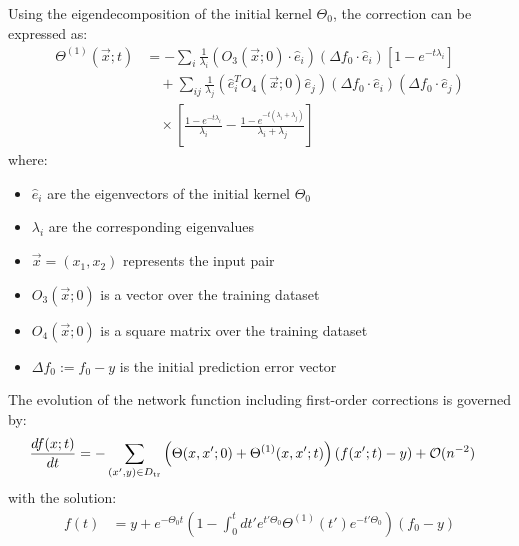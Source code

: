 \documentclass[a4paper]{article}
\begin{document}
\begin{theorem}\label{thm:eigen_corrections}
Using the eigendecomposition of the initial kernel $\Theta_0$, the correction can be expressed as:
\begin{align}
\Theta^{(1)}(\vec{x};t) &= -\sum_{i}\frac{1}{\lambda_{i}}(O_{3}(\vec{x};0)\cdot\hat{e}_{i})(\Delta f_{0}\cdot\hat{e}_{i})\left[1-e^{-t\lambda_{i}}\right] \nonumber\\
&\quad +\sum_{ij}\frac{1}{\lambda_{j}}(\hat{e}_{i}^{T}O_{4}(\vec{x};0)\hat{e}_{j})(\Delta f_{0}\cdot \hat{e}_{i})(\Delta f_{0}\cdot \hat{e}_{j}) \nonumber\\
&\quad \times \left[\frac{1-e^{-t\lambda_{i}}}{\lambda_{i}}-\frac{1-e^{-t(\lambda_{i}+\lambda_{j})}}{\lambda_{i}+\lambda_{j}}\right] \label{eq:eigen_expansion}
\end{align}
where:
\begin{itemize}
\item $\hat{e}_{i}$ are the eigenvectors of the initial kernel $\Theta_{0}$
\item $\lambda_{i}$ are the corresponding eigenvalues
\item $\vec{x} = (x_1,x_2)$ represents the input pair
\item $O_{3}(\vec{x};0)$ is a vector over the training dataset
\item $O_{4}(\vec{x};0)$ is a square matrix over the training dataset
\item $\Delta f_{0} := f_{0} - y$ is the initial prediction error vector
\end{itemize}
\end{theorem}

\begin{corollary}\label{cor:network_evolution}
The evolution of the network function including first-order corrections is governed by:
\begin{align}
\frac{df(x;t)}{dt} &= -\sum_{(x',y)\in D_{\rm tr}}\left(\Theta(x,x';0)+\Theta^{(1)}(x,x';t)\right)\left(f(x';t)-y\right) + \mathcal{O}(n^{-2}) \label{eq:evolution_ode}
\end{align}
with the solution:
\begin{align}
f(t) &= y + e^{-\Theta_{0}t}\left(1-\int_{0}^{t}dt'e^{t'\Theta_{0}}\Theta^{(1)}(t')e^{-t'\Theta_{0}}\right)\left(f_{0}-y\right) \label{eq:evolution_solution}
\end{align}
\end{corollary}
\end{document}

